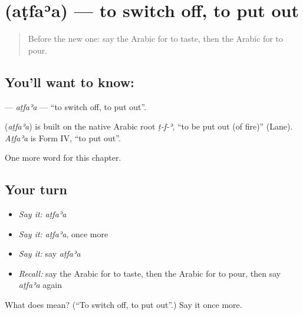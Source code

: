 \section[\texorpdfstring{\ar{أطفأ} (aṭfaʾa)}{أطفأ (aṭfaʾa)}]{ (aṭfaʾa) — to switch off, to put out}

\label{lesson:AR-C160-atfaa}



\begin{quote}
Before the new one: say the Arabic for to taste, then the Arabic for to pour.
\end{quote}

\subsection*{You'll want to know: }
\textbf{} — \emph{aṭfaʾa} — \textquotedblleft{}to switch off, to put out\textquotedblright{}.

\begin{cousinweb}
\textbf{} (\emph{aṭfaʾa}) is built on the native Arabic root \emph{ṭ-f-ʾ}, \textquotedblleft{}to be put out (of fire)\textquotedblright{} (Lane). \emph{Aṭfaʾa} is Form IV, \textquotedblleft{}to put out\textquotedblright{}.
\end{cousinweb}

\begin{grammarlens}[title={What you've built}]
One more word for this chapter.
\end{grammarlens}

\subsection*{Your turn}
\begin{itemize}
\raggedright
  \item \emph{Say it:} \emph{aṭfaʾa}
  \item \emph{Say it:} \emph{aṭfaʾa}, once more
  \item \emph{Say it:} say \emph{aṭfaʾa}
  \item \emph{Recall:} say the Arabic for to taste, then the Arabic for to pour, then say \emph{aṭfaʾa} again
\end{itemize}

\begin{tcolorbox}[breakable,colback=teal!4,colframe=teal!35!black,title={Before you move on}]
What does  mean? (\textquotedblleft{}To switch off, to put out\textquotedblright{}.) Say it once more.
\end{tcolorbox}
